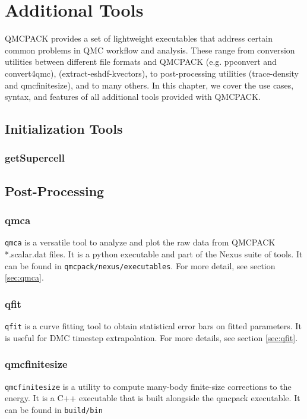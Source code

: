 \chapter{Additional Tools}
\label{chap:additional_tools}
QMCPACK provides a set of lightweight executables that address certain
common problems in QMC workflow and analysis.  These range from conversion utilities between 
different file formats and QMCPACK (e.g. ppconvert and convert4qmc),  
(extract-eshdf-kvectors), to post-processing utilities (trace-density and qmcfinitesize), and to many others.  In this chapter, we cover the use cases, syntax, and features of all additional tools provided with QMCPACK.  

\section{Initialization Tools}
  \subsection{getSupercell}

\section{Post-Processing}
  \subsection{qmca}
    \texttt{qmca} is a versatile tool to analyze and plot the raw data from QMCPACK *.scalar.dat files.
    It is a python executable and part of the Nexus suite of tools.  It can be found in 
    \texttt{qmcpack/nexus/executables}. For more detail, see section \ref{sec:qmca}.
  \subsection{qfit}
    \texttt{qfit} is a curve fitting tool to obtain statistical error bars on fitted parameters.
    It is useful for DMC timestep extrapolation.  For more details, see section \ref{sec:qfit}.
  \subsection{qmcfinitesize}
    \texttt{qmcfinitesize} is a utility to compute many-body finite-size corrections to the energy.  It
    is a C++ executable that is built alongside the qmcpack executable.  It can be found in 
    \texttt{build/bin}

